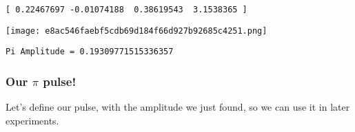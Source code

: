 \begin{verbatim}
[ 0.22467697 -0.01074188  0.38619543  3.1538365 ]
\end{verbatim}

\texttt{[image: e8ac546faebf5cdb69d184f66d927b92685c4251.png]}

\hypertarget{096f5118-d5f5-45c5-8841-261af97ab9b7}{}
\begin{Shaded}
\begin{Highlighting}[]
\OperatorTok{=} \OperatorTok{/} \NormalTok{)}
\NormalTok{(}\SpecialCharTok{\{}\SpecialCharTok{\}}\NormalTok{)}
\end{Highlighting}
\end{Shaded}

\begin{verbatim}
Pi Amplitude = 0.19309771515336357
\end{verbatim}

\hypertarget{8ecf2349-58a1-4390-a8cb-0616b221c41f}{}
\hypertarget{our-pi-pulse}{%
\subsubsection{\texorpdfstring{Our \(\pi\)
pulse!}{Our \textbackslash pi pulse!}}\label{our-pi-pulse}}

Let's define our pulse, with the amplitude we just found, so we can use
it in later experiments.

\hypertarget{ef7d0882-174c-4462-8d00-efb23910c081}{}
\begin{Shaded}
\begin{Highlighting}[]
\OperatorTok{=}
\OperatorTok{=}
\OperatorTok{=}
\OperatorTok{=}
\OperatorTok{=}
\OperatorTok{=}
\OperatorTok{=}
\OperatorTok{=}
\end{Highlighting}
\end{Shaded}

